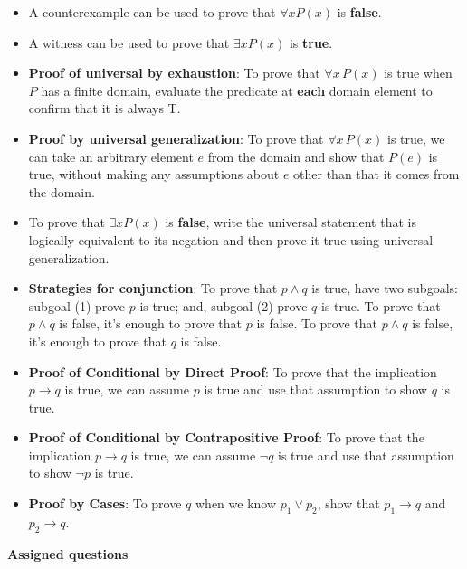 \documentclass[12pt, oneside]{article}
\begin{document}
\vspace{-10pt}

\begin{itemize}
    \item A counterexample can be used to prove that  $\forall x P(x)$ is {\bf false}.
    \item  A witness can be used  to  prove that  $\exists x P(x)$ is {\bf true}.
    \item {\bf Proof of universal by exhaustion}: To prove that $\forall x \, P(x)$
is true when $P$ has a finite domain, evaluate the predicate at {\bf each} domain element to confirm that it is always T.
    \item  {\bf Proof by universal generalization}: To prove that $\forall x \, P(x)$
is true, we can take an arbitrary element $e$ from the domain and show that $P(e)$ is true, without making any assumptions about $e$ other than that it comes from the domain.
    \item To  prove  that $\exists x P(x)$ is {\bf false}, write the universal statement that is logically equivalent to its negation and then prove it true using universal generalization.
    \item {\bf Strategies for conjunction}: To prove that $p \land q$ is true, have two subgoals: subgoal (1) prove $p$ 
is  true; and, subgoal (2) prove $q$ is true. To prove that $p \land q$ is false, it's enough to prove that $p$ is false.
 To prove that $p \land q$ is false, it's enough to prove that $q$ is false.
    \item {\bf Proof of Conditional by Direct Proof}: To prove that the implication $p \to q$ is true, we can assume $p$ is true and use that assumption to show $q$ is true.
    \item {\bf Proof of Conditional by Contrapositive Proof}: To prove that the implication $p \to q$ is true, we can assume $\neg q$ is true and use that assumption to show $\neg p$ is true.
    \item {\bf Proof by Cases}: To prove $q$ when we know $p_1 \lor p_2$, show that $p_1 \to q$ and $p_2 \to q$.
\end{itemize}


{\bf Assigned questions}
\end{document}

